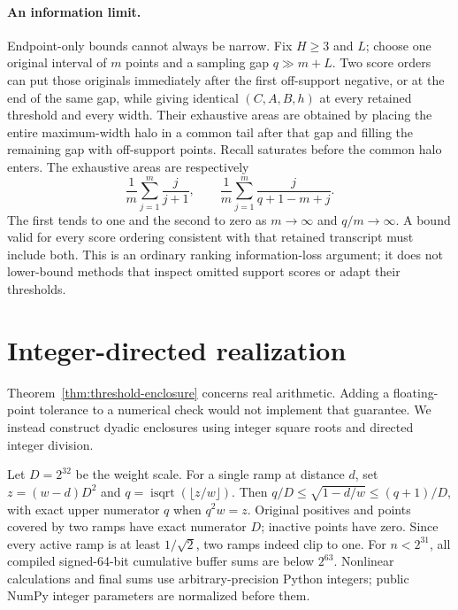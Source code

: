 \paragraph{An information limit.}
Endpoint-only bounds cannot always be narrow. Fix $H\geq3$ and $L$;
choose one original interval of $m$ points and a sampling gap $q\gg m+L$.
Two score orders can put those originals immediately after the first
off-support negative, or at the end of the same gap, while giving identical
$(C,A,B,h)$ at every retained threshold and every width. Their exhaustive
areas are obtained by placing the entire maximum-width halo in a common
tail after that gap and filling the remaining gap with off-support points.
Recall saturates before the common halo enters. The exhaustive
areas are respectively
\[
 \frac1m\sum_{j=1}^m\frac{j}{j+1},\qquad
 \frac1m\sum_{j=1}^m\frac{j}{q+1-m+j}.
\]
The first tends to one and the second to zero as $m\to\infty$ and
$q/m\to\infty$. A bound valid for every score ordering consistent with
that retained transcript must include both. This is an ordinary ranking
information-loss argument; it does not lower-bound methods that inspect
omitted support scores or adapt their thresholds.

\section{Integer-directed realization}
\label{sec:integer-certificate}
Theorem~\ref{thm:threshold-enclosure} concerns real arithmetic. Adding a
floating-point tolerance to a numerical check would not implement that
guarantee. We instead construct dyadic enclosures using integer square
roots and directed integer division.

Let $D=2^{32}$ be the weight scale. For a single ramp at distance $d$,
set $z=(w-d)D^2$ and $q=\operatorname{isqrt}(\lfloor z/w\rfloor)$.
Then $q/D\leq\sqrt{1-d/w}\leq(q+1)/D$, with exact upper numerator
$q$ when $q^2w=z$. Original positives and points covered by two ramps have
exact numerator $D$; inactive points have zero. Since every active ramp
is at least $1/\sqrt2$, two ramps indeed clip to one. For $n<2^{31}$,
all compiled signed-64-bit cumulative buffer sums are below $2^{63}$.
Nonlinear calculations and final sums use arbitrary-precision Python
integers; public NumPy integer parameters are normalized before them.

